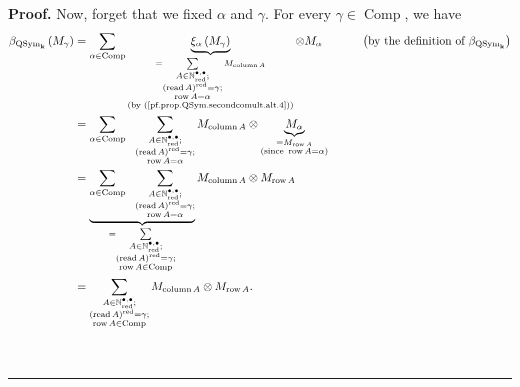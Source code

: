 \documentclass[numbers=enddot,12pt,final,onecolumn,notitlepage,abstracton]{scrartcl}%
\theoremstyle{definition}
\newenvironment{proof}[1][Proof]{\noindent\textbf{#1.} }{\ \rule{0.5em}{0.5em}}
\let\sumnonlimits\sum
\renewcommand{\sum}{\sumnonlimits\limits}
\begin{document}
\begin{proof}
Now, forget that we fixed $\alpha$ and $\gamma$. For every $\gamma
\in\operatorname*{Comp}$, we have%
\begin{align}
\beta_{\operatorname*{QSym}\nolimits_{\mathbf{k}}}\left(  M_{\gamma}\right)
&  =\sum_{\alpha\in\operatorname*{Comp}}\underbrace{\xi_{\alpha}\left(
M_{\gamma}\right)  }_{\substack{=\sum_{\substack{A\in\mathbb{N}%
_{\operatorname*{red}}^{\bullet,\bullet}\text{;}\\\left(  \operatorname*{read}%
A\right)  ^{\operatorname*{red}}=\gamma\text{;}\\\operatorname*{row}A=\alpha
}}M_{\operatorname*{column}A}\\\text{(by
(\ref{pf.prop.QSym.secondcomult.alt.4}))}}}\otimes M_{\alpha}%
\ \ \ \ \ \ \ \ \ \ \left(  \text{by the definition of }\beta
_{\operatorname*{QSym}\nolimits_{\mathbf{k}}}\right) \nonumber\\
&  =\sum_{\alpha\in\operatorname*{Comp}}\ \ \sum_{\substack{A\in
\mathbb{N}_{\operatorname*{red}}^{\bullet,\bullet}\text{;}\\\left(
\operatorname*{read}A\right)  ^{\operatorname*{red}}=\gamma\text{;}%
\\\operatorname*{row}A=\alpha}}M_{\operatorname*{column}A}\otimes
\underbrace{M_{\alpha}}_{\substack{=M_{\operatorname*{row}A}\\\text{(since
}\operatorname*{row}A=\alpha\text{)}}}\nonumber\\
&  =\underbrace{\sum_{\alpha\in\operatorname*{Comp}}\ \ \sum_{\substack{A\in
\mathbb{N}_{\operatorname*{red}}^{\bullet,\bullet}\text{;}\\\left(
\operatorname*{read}A\right)  ^{\operatorname*{red}}=\gamma\text{;}%
\\\operatorname*{row}A=\alpha}}}_{=\sum_{\substack{A\in\mathbb{N}%
_{\operatorname*{red}}^{\bullet,\bullet}\text{;}\\\left(  \operatorname*{read}%
A\right)  ^{\operatorname*{red}}=\gamma\text{;}\\\operatorname*{row}%
A\in\operatorname*{Comp}}}}M_{\operatorname*{column}A}\otimes
M_{\operatorname*{row}A}\nonumber\\
&  =\sum_{\substack{A\in\mathbb{N}_{\operatorname*{red}}^{\bullet,\bullet
}\text{;}\\\left(  \operatorname*{read}A\right)  ^{\operatorname*{red}}%
=\gamma\text{;}\\\operatorname*{row}A\in\operatorname*{Comp}}%
}M_{\operatorname*{column}A}\otimes M_{\operatorname*{row}A}.
\label{pf.prop.QSym.secondcomult.alt.-2}%
\end{align}



\end{proof}
\end{document}
